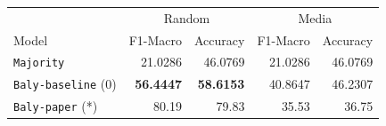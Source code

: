 \begin{table}[!htbp]
    \centering
   \scriptsize
    \begin{tabular}{l|rr|rr}
        & \multicolumn{2}{c}{Random} & \multicolumn{2}{c}{Media} \\
        Model & F1-Macro & Accuracy & F1-Macro & Accuracy \\
        \hline
        \texttt{Majority} & 21.0286 & 46.0769 & 21.0286 & 46.0769 \\
        \texttt{Baly-baseline} (0) & \textbf{56.4447} & \textbf{58.6153} & 40.8647 & 46.2307 \\
        \texttt{Baly-paper} (*) & 80.19 & 79.83 & 35.53 & 36.75 \\
        

\end{tabular}
\end{table}
